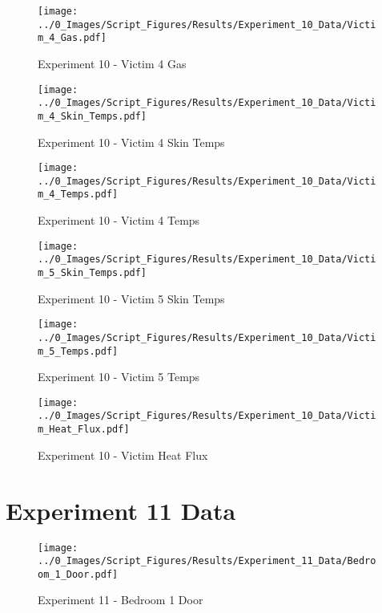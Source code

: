 	\begin{figure}[H]
		\centering
		\texttt{[image: ../0\_Images/Script\_Figures/Results/Experiment\_10\_Data/Victim\_4\_Gas.pdf]}
		\caption[]{Experiment 10 - Victim 4 Gas}
	\end{figure}
 
	\clearpage

	\begin{figure}[H]
		\centering
		\texttt{[image: ../0\_Images/Script\_Figures/Results/Experiment\_10\_Data/Victim\_4\_Skin\_Temps.pdf]}
		\caption[]{Experiment 10 - Victim 4 Skin Temps}
	\end{figure}
 

	\begin{figure}[H]
		\centering
		\texttt{[image: ../0\_Images/Script\_Figures/Results/Experiment\_10\_Data/Victim\_4\_Temps.pdf]}
		\caption[]{Experiment 10 - Victim 4 Temps}
	\end{figure}
 
	\clearpage

	\begin{figure}[H]
		\centering
		\texttt{[image: ../0\_Images/Script\_Figures/Results/Experiment\_10\_Data/Victim\_5\_Skin\_Temps.pdf]}
		\caption[]{Experiment 10 - Victim 5 Skin Temps}
	\end{figure}
 

	\begin{figure}[H]
		\centering
		\texttt{[image: ../0\_Images/Script\_Figures/Results/Experiment\_10\_Data/Victim\_5\_Temps.pdf]}
		\caption[]{Experiment 10 - Victim 5 Temps}
	\end{figure}
 
	\clearpage

	\begin{figure}[H]
		\centering
		\texttt{[image: ../0\_Images/Script\_Figures/Results/Experiment\_10\_Data/Victim\_Heat\_Flux.pdf]}
		\caption[]{Experiment 10 - Victim Heat Flux}
	\end{figure}
 

\clearpage		\large
\section{Experiment 11 Data} \label{App:Exp11Results} 

	\begin{figure}[H]
		\centering
		\texttt{[image: ../0\_Images/Script\_Figures/Results/Experiment\_11\_Data/Bedroom\_1\_Door.pdf]}
		\caption[]{Experiment 11 - Bedroom 1 Door}
	\end{figure}
 

